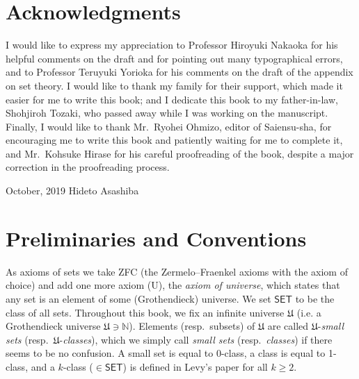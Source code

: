 \documentclass{surv-l}
\numberwithin{equation}{chapter}
\numberwithin{figure}{chapter}
\theoremstyle{plain}
\theoremstyle{definition}
\theoremstyle{remark}
\begin{document}
\chapter*{Acknowledgments}
I would like to express my appreciation to Professor Hiroyuki Nakaoka
for his helpful comments on the draft and for pointing out many typographical errors,
and to Professor Teruyuki Yorioka for his comments on the draft of the appendix on set theory.
I would like to thank my family for their support, which made it easier for me to write this book; and
I dedicate this book to my father-in-law, Shohjiroh Tozaki, who passed away while I was working on the manuscript.
Finally, I would like to thank Mr.\ Ryohei Ohmizo, editor of Saiensu-sha, for encouraging me to write this book and patiently waiting for me to complete it, and Mr.\ Kohsuke Hirase for his careful proofreading of the book, despite a major correction in the proofreading process.

\medskip

October, 2019
\hfill Hideto Asashiba




\chapter*{Preliminaries and Conventions}
As axioms of sets we take ZFC
(the Zermelo--Fraenkel axioms with the axiom of choice)
and add one more axiom (U),
the \emph{axiom of universe}, which states that
any set is an element of some (Grothendieck) universe.
We set $\mathsf{SET}$ to be the class of all sets.
Throughout this book, we fix an infinite universe $\mathfrak{U}$
(i.e. a Grothendieck universe $\mathfrak{U} \ni \mathbb{N}$).
Elements (resp.\ subsets) of $\mathfrak{U}$ are called $\mathfrak{U}$-\emph{small sets}
(resp.\ $\mathfrak{U}$-\emph{classes}), which we simply call \emph{small sets}
(resp.\ \emph{classes}) if there seems to be no confusion.
A small set is equal to 0-class,
a class is equal to 1-class, and a $k$-class ($\in \mathsf{SET}$) is defined
in Levy's paper \cite{Le18} for all $k \ge 2$.
\end{document}
